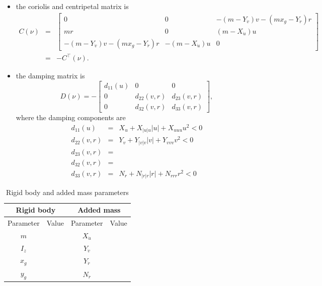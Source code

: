 \documentclass[a4paper,twoside,english]{report}
\providecommand{\tabularnewline}{\\}
\begin{document}
\begin{itemize}
\item the coriolis and centripetal matrix is
\begin{eqnarray*}
C\left(\nu\right) & = & \left[\begin{array}{ccc}
0 & 0 & -\left(m-Y_{\dot{v}}\right)v-\left(mx_{g}-Y_{\dot{r}}\right)r\\
mr & 0 & \left(m-X_{\dot{u}}\right)u\\
-\left(m-Y_{\dot{v}}\right)v-\left(mx_{g}-Y_{\dot{r}}\right)r & -\left(m-X_{\dot{u}}\right)u & 0
\end{array}\right]\\
 & = & -C^{\top}\left(\nu\right).
\end{eqnarray*}
\item the damping matrix is
\[
D\left(\nu\right)=-\left[\begin{array}{ccc}
d_{11}\left(u\right) & 0 & 0\\
0 & d_{22}\left(v,r\right) & d_{23}\left(v,r\right)\\
0 & d_{32}\left(v,r\right) & d_{33}\left(v,r\right)
\end{array}\right],
\]
where the damping components are 
\begin{eqnarray}
d_{11}\left(u\right) & = & X_{u}+X_{\left\vert u\right\vert u}\left\vert u\right\vert +X_{uuu}u^{2}<0\label{Eq:d11-1}\\
d_{22}\left(v,r\right) & = & Y_{v}+Y_{\left\vert v\right\vert v}\left\vert v\right\vert +Y_{vvv}v^{2}<0\label{Eq:d22-1}\\
d_{23}\left(v,r\right) & =\label{Eq:d23-1}\\
d_{32}\left(v,r\right) & =\label{Eq:d32-1}\\
d_{33}\left(v,r\right) & = & N_{r}+N_{\left\vert r\right\vert r}\left\vert r\right\vert +N_{rrr}r^{2}<0\label{Eq:d33-1}
\end{eqnarray}
\end{itemize}
\begin{table}
\begin{centering}
\begin{tabular}{crcr}
\multicolumn{2}{c}{Rigid body} & \multicolumn{2}{c}{Added mass}\tabularnewline
\midrule 
Parameter & Value & Parameter & Value\tabularnewline
\midrule 
$m$  &  & $X_{\dot{u}}$  & \tabularnewline
$I_{z}$  &  & $Y_{\dot{v}}$  & \tabularnewline
$x_{g}$  &  & $Y_{\dot{r}}$  & \tabularnewline
$y_{g}$  &  & $N_{\dot{r}}$  & \tabularnewline
\bottomrule
\end{tabular}
\par\end{centering}
\caption{\label{tab: CSE1-rigid-body-1}Rigid body and added mass parameters}
\end{table}
\end{document}
